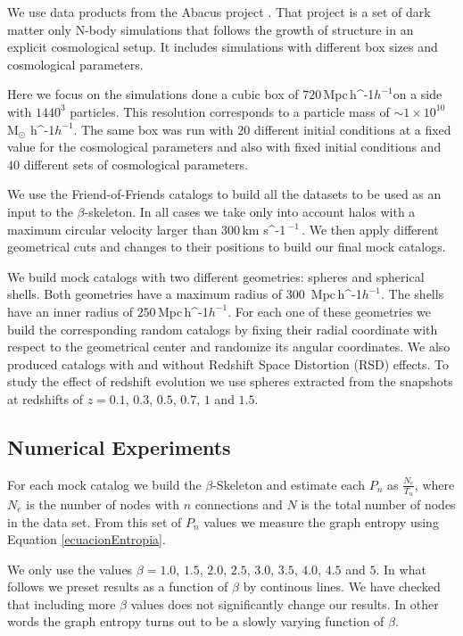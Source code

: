 \documentclass[fleqn,usenatbib]{mnras}
\newcommand{\Msunh}{\,{\rm M}$_{\odot}$\,\,\ifmmode h^{-1}\else $h^{-1}$\fi}
\newcommand{\kms}{\,{\rm km s}\ifmmode ^{-1}\,\else $^{-1}$\,\fi}
\newcommand{\Mpch}{\,{\rm Mpc}\,\ifmmode h^{-1}\else $h^{-1}$\fi}
\begin{document}
We use data products from the Abacus project \citep{abacus}.
That project is a set of dark matter only N-body simulations that follows
the growth of structure in an explicit cosmological setup.
It includes simulations with different box sizes and cosmological parameters.

Here we focus on the simulations done a cubic box of $720$\Mpch on a side
with $1440^3$ particles. 
This resolution corresponds to a particle mass of $\sim1\times10^{10}$ \Msunh.
The same box was run with $20$ different initial conditions at a fixed value for
the cosmological parameters and also with fixed initial conditions and $40$ different
sets of cosmological parameters.

We use the Friend-of-Friends catalogs to build all the datasets to be used
as an input to the $\beta$-skeleton. In all cases we take only into account halos
with a maximum circular velocity larger than $300$\kms. 
We then apply different geometrical cuts and changes to their positions to build 
our final mock catalogs.

We build mock catalogs with two different geometries: spheres and spherical shells.
Both geometries have a maximum radius of $300$ \Mpch.
The shells have an inner radius of $250$\Mpch.
For each one of these geometries we build the corresponding random catalogs
by fixing their radial coordinate with respect to the geometrical center and 
randomize its angular coordinates.
We also produced catalogs with and without Redshift Space Distortion (RSD) effects. 
To study the effect of redshift evolution we use spheres extracted from
the snapshots at redshifts of $z=0.1$, $0.3$, $0.5$, $0.7$, $1$ and $1.5$.



\subsection{Numerical Experiments}

For each mock catalog we build the $\beta$-Skeleton and estimate each $P_n$ as  $\frac{N_e}{T_n}$, where $N_e$ is the number of nodes with $n$ connections and $N$ is the
total number of nodes in the data set.
From this set of $P_n$ values we measure the graph entropy using Equation \ref{ecuacionEntropia}.

We only use the values $\beta=1.0$, $1.5$, $2.0$, $2.5$, $3.0$, $3.5$, $4.0$, $4.5$ and $5$.
In what follows we preset results as a function of $\beta$ by continous lines.
We have checked that including more $\beta$ values does not significantly change
our results. 
In other words the graph entropy turns out to be a slowly varying function of $\beta$.
\end{document}

